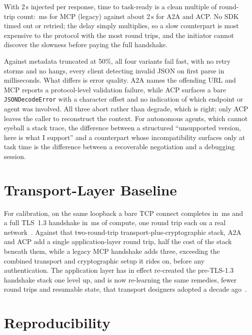 \documentclass{article}
\newcommand{\mcpl}{MCP (legacy)}
\newcommand{\code}[1]{\mbox{\texttt{#1}}}
\begin{document}
With 2\,s injected per response, time to task-ready is a clean multiple of
round-trip count: \SFourAMcpLegacyLocalMed{}\,ms for \mcpl{} against about
2\,s for A2A and ACP. No SDK timed out or retried; the delay simply
multiplies, so a slow counterpart is most expensive to the protocol with
the most round trips, and the initiator cannot discover the slowness before
paying the full handshake.

Against metadata truncated at 50\%, all four variants fail fast, with no
retry storms and no hangs, every client detecting invalid JSON on first
parse in milliseconds. What differs is error quality. A2A names the
offending URL and MCP reports a protocol-level validation failure, while
ACP surfaces a bare \code{JSONDecodeError} with a character offset and no
indication of which endpoint or agent was involved. All three abort rather
than degrade, which is right; only ACP leaves the caller to reconstruct the
context. For autonomous agents, which cannot eyeball a stack trace, the
difference between a structured ``unsupported version, here is what I
support'' and a counterpart whose incompatibility surfaces only at task
time is the difference between a recoverable negotiation and a debugging
session.

\section{Transport-Layer Baseline}
\label{app:baseline}

For calibration, on the same loopback a bare TCP connect completes in
\BaselineTcpMed{}\,ms and a full TLS~1.3 handshake in \BaselineTlsMed{}\,ms
of compute, one round trip each on a real network~\citep{rescorla2018tls}.
Against that two-round-trip transport-plus-cryptographic stack, A2A and ACP
add a single application-layer round trip, half the cost of the stack
beneath them, while a legacy MCP handshake adds three, exceeding the
combined transport and cryptographic setup it rides on, before any
authentication. The application layer has in effect re-created the
pre-TLS-1.3 handshake stack one level up, and is now re-learning the same
remedies, fewer round trips and resumable state, that transport designers
adopted a decade ago~\citep{lee2021tls,iyengar2021quic}.

\section{Reproducibility}
\label{app:repro}
\end{document}

